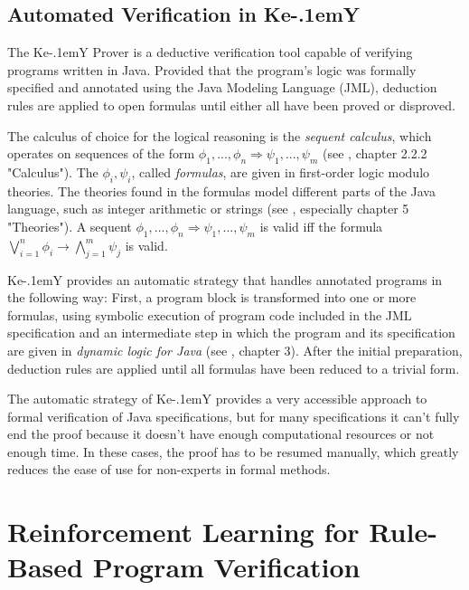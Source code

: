 \documentclass[runningheads,a4paper]{llncs}
\begin{document}
\subsection*{Automated Verification in Ke\kern-.1em{Y}}
\label{ss:key}

The Ke\kern-.1em{Y} Prover \cite{DBLP:series/lncs/10001} is a deductive verification tool capable of verifying programs written in Java. Provided that the program's logic was formally specified and annotated using the Java Modeling Language (JML), deduction rules are applied to open formulas until either all have been proved or disproved.

The calculus of choice for the logical reasoning is the \textit{sequent calculus}, which operates on sequences of the form $\phi_1, ..., \phi_n \Rightarrow \psi_1, ..., \psi_m$ (see \cite{DBLP:series/lncs/10001}, chapter 2.2.2 "Calculus"). The $\phi_i, \psi_i$, called \textit{formulas}, are given in first-order logic modulo theories. The theories found in the formulas model different parts of the Java language, such as integer arithmetic or strings (see \cite{DBLP:series/lncs/10001}, especially chapter 5 "Theories"). A sequent $\phi_1, ..., \phi_n \Rightarrow \psi_1, ..., \psi_m$ is valid iff the formula $\bigvee_{i=1}^{n}\phi_i \rightarrow \bigwedge_{j=1}^{m}\psi_j$ is valid.

Ke\kern-.1em{Y} provides an automatic strategy that handles annotated programs in the following way: First, a program block is transformed into one or more formulas, using symbolic execution of program code included in the JML specification and an intermediate step in which the program and its specification are given in \textit{dynamic logic for Java} (see \cite{DBLP:series/lncs/10001}, chapter 3). After the initial preparation, deduction rules are applied until all formulas have been reduced to a trivial form.

The automatic strategy of Ke\kern-.1em{Y} provides a very accessible approach to formal verification of Java specifications, but for many specifications it can't fully end the proof because it doesn't have enough computational resources or not enough time. In these cases, the proof has to be resumed manually, which greatly reduces the ease of use for non-experts in formal methods.


\section*{Reinforcement Learning for Rule-Based Program Verification}
\label{s:rl4sv}
\end{document}
